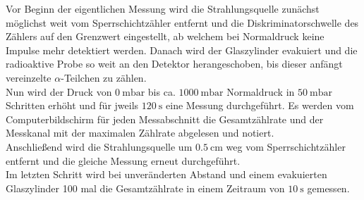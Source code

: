 Vor Beginn der eigentlichen Messung wird die Strahlungsquelle zunächst möglichst weit vom Sperrschichtzähler
entfernt und die Diskriminatorschwelle des Zählers auf den Grenzwert eingestellt, ab welchem bei Normaldruck 
keine Impulse mehr detektiert werden. Danach wird der Glaszylinder evakuiert und die radioaktive Probe so weit 
an den Detektor herangeschoben, bis dieser anfängt vereinzelte $\alpha$-Teilchen zu zählen. \\
Nun wird der Druck von $\SI{0}{\milli\bar}$ bis ca. $\SI{1000}{\milli\bar}$ Normaldruck in $\SI{50}{\milli\bar}$ 
Schritten erhöht und für jweils $\SI{120}{\second}$ eine Messung durchgeführt. Es werden vom Computerbildschirm für 
jeden Messabschnitt die Gesamtzählrate und der Messkanal mit der maximalen Zählrate abgelesen und notiert. \\
Anschließend wird die Strahlungsquelle um $\SI{0.5}{\centi\meter}$ weg vom Sperrschichtzähler entfernt und die 
gleiche Messung erneut durchgeführt. \\
Im letzten Schritt wird bei unveränderten Abstand und einem evakuierten Glaszylinder 100 mal die Gesamtzählrate 
in einem Zeitraum von $\SI{10}{\second}$ gemessen. 